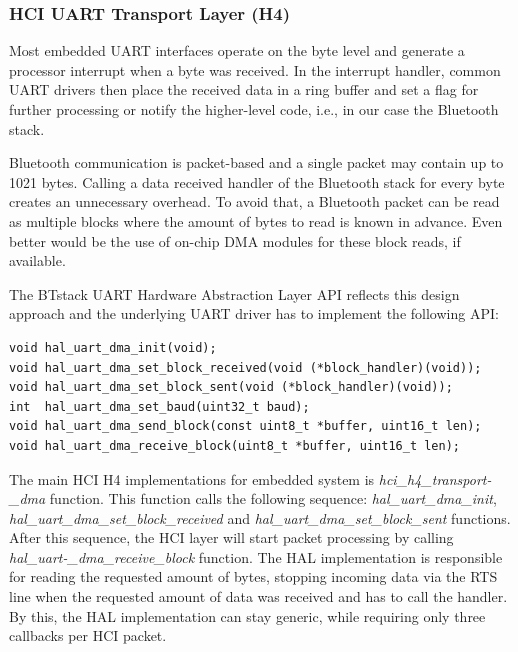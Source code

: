 \documentclass[a4paper,titlepage,oneside,12pt]{amsart} %
\begin{document}
 \subsubsection{HCI UART Transport Layer (H4)}
 \label{section:hciUART}
Most embedded UART interfaces operate on the byte level and generate a processor interrupt when a byte was received. In the interrupt handler, common UART drivers then place the received data in a ring buffer and set a flag for further processing or notify the higher-level code, i.e., in our case the Bluetooth stack.

Bluetooth communication is packet-based and a single packet may contain up to 1021 bytes. Calling a data received handler of the Bluetooth stack for every byte creates an unnecessary overhead. To avoid that, a Bluetooth packet can be read as multiple blocks where the amount of bytes to read is known in advance. Even better would be the use of on-chip DMA modules for these block reads, if available.


The BTstack UART Hardware Abstraction Layer API reflects this design approach and the underlying UART driver has to implement the following API:

 \begin{lstlisting}
void hal_uart_dma_init(void);
void hal_uart_dma_set_block_received(void (*block_handler)(void));
void hal_uart_dma_set_block_sent(void (*block_handler)(void));
int  hal_uart_dma_set_baud(uint32_t baud);
void hal_uart_dma_send_block(const uint8_t *buffer, uint16_t len);
void hal_uart_dma_receive_block(uint8_t *buffer, uint16_t len);
 \end{lstlisting}
 
The main HCI H4 implementations for embedded system is \emph{hci\_h4\_transport-\_dma} function. This function calls the following sequence: \emph{hal\_uart\_dma\_init}, \emph{hal\_uart\_dma\_set\_block\_received} and \emph{hal\_uart\_dma\_set\_block\_sent} functions. \mbox{After} this sequence, the HCI layer will start packet processing by calling \emph{hal\_uart-\_dma\_receive\_block} function. The HAL implementation is responsible for reading the requested amount of bytes, stopping incoming data via the RTS line when the requested amount of data was received and has to call the handler. By this, the HAL implementation can stay generic, while requiring only three callbacks per HCI packet. 
\end{document}
